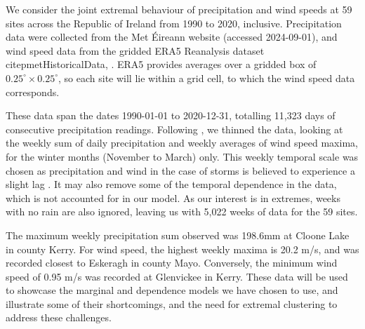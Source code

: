 \documentclass{article}
\numberwithin{equation}{section}
\begin{document}
We consider the joint extremal behaviour of precipitation and wind speeds at 59 sites across the Republic of Ireland from 1990 to 2020, inclusive.  
Precipitation data were collected from the Met Éireann website (accessed 2024-09-01), and wind speed data from the gridded ERA5 Reanalysis dataset citep{metHistoricalData}, \citep{Hersbach2020}.
ERA5 provides averages over a gridded box of $0.25^{\circ} \times 0.25^{\circ}$, so each site will lie within a grid cell, to which the wind speed data corresponds.

These data span the dates 1990-01-01 to 2020-12-31, totalling 11,323 days of consecutive precipitation readings. 
Following \citet{Vignotto2021}, we thinned the data, looking at the weekly sum of daily precipitation and weekly averages of wind speed maxima, for the winter months (November to March) only.
This weekly temporal scale was chosen as precipitation and wind in the case of storms is believed to experience a slight lag \citep{Bengtsson2009}.
It may also remove some of the temporal dependence in the data, which is not accounted for in our model.
As our interest is in extremes, weeks with no rain are also ignored, leaving us with 5,022 weeks of data for the 59 sites.

The maximum weekly precipitation sum observed was 198.6mm at Cloone Lake in county Kerry. 
For wind speed, the highest weekly maxima is 20.2 m/s, and was recorded closest to Eskeragh in county Mayo.
Conversely, the minimum wind speed of 0.95 m/s was recorded at Glenvickee in Kerry. %
These data will be used to showcase the marginal and dependence models we have chosen to use, and illustrate some of their shortcomings, and the need for extremal clustering to address these challenges.
\end{document}
